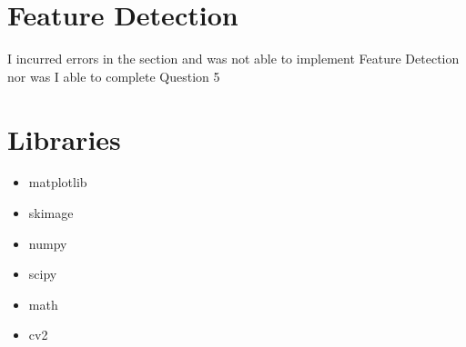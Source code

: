 \documentclass{article}
\begin{document}
\section{Feature Detection}
I incurred errors in the section and was not able to implement Feature Detection nor was I able to complete Question 5

\section{Libraries}
\begin{itemize}
  \item matplotlib
  \item skimage
  \item numpy
  \item scipy
  \item math
  \item cv2
\end{itemize}
\end{document}
